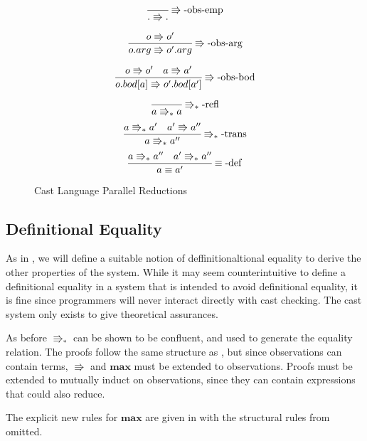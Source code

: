 \begin{figure}
\[
\frac{\,}{.\Rrightarrow.}
\operatorname{\Rrightarrow-obs-emp}
\]
 
\[
\frac{o\Rrightarrow o'}{o.arg\Rrightarrow o'.arg}
\operatorname{\Rrightarrow-obs-arg}
\]
 
\[
\frac{o\Rrightarrow o'\quad a\Rrightarrow a'}{o.bod[a]\Rrightarrow o'.bod[a']}
\operatorname{\Rrightarrow-obs-bod}
\]
 
\[
\frac{\,}{a\Rrightarrow_{\ast}a}
\operatorname{\Rrightarrow_{\ast}-refl}
\]
\[
\frac{a\Rrightarrow_{\ast}a'\quad a'\Rrightarrow a''}{a\Rrightarrow_{\ast}a''}
\operatorname{\Rrightarrow_{\ast}-trans}
\]
\[
\frac{a\Rrightarrow_{\ast}a''\quad a'\Rrightarrow_{\ast}a''}{a\equiv a'}
\operatorname{\equiv-def}
\]
 
\caption{Cast Language Parallel Reductions}
\label{fig:cast-reduction}
\end{figure}
 
\subsection{Definitional Equality}
 
As in , we will define a suitable notion of deffinitionaltional equality to derive the other properties of the system.
While it may seem counterintuitive to define a definitional equality in a system that is intended to avoid definitional equality, it is fine since programmers will never interact directly with cast checking.
The cast system only exists to give theoretical assurances.
 
As before $\Rrightarrow_{*}$ can be shown to be confluent, and used to generate the equality relation.
The proofs follow the same structure as , but since observations can contain terms, $\Rrightarrow$ and $\textbf{max}$ must be extended to observations.
Proofs must be extended to mutually induct on observations, since they can contain expressions that could also reduce.
 
The explicit new rules for $\textbf{max}$  are given in  with the structural rules from  omitted.
 
